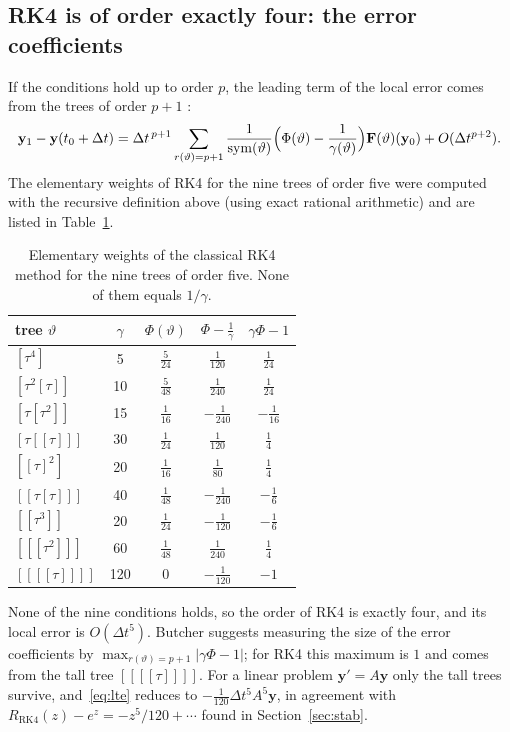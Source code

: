 \documentclass[11pt,a4paper]{article}
\newcommand{\Dt}{\Delta t}
\newcommand{\bfy}{\mathbf{y}}
\begin{document}
\subsection{RK4 is of order exactly four: the error coefficients}\label{sec:rk4err}

If the conditions hold up to order $p$, the leading term of the local error comes from the trees of order
$p+1$ \cite[Sect.~318]{butcher2008}:
\begin{equation}
\bfy_1-\bfy(t_0+\Dt)=\Dt^{\,p+1}\sum_{r(\vartheta)=p+1}\frac{1}{\mathrm{sym}(\vartheta)}
\Bigl(\Phi(\vartheta)-\frac1{\gamma(\vartheta)}\Bigr)\mathbf F(\vartheta)(\bfy_0)+O(\Dt^{p+2}).
\label{eq:lte}
\end{equation}
The elementary weights of RK4 for the nine trees of order five were computed with the recursive definition
above (using exact rational arithmetic) and are listed in Table~\ref{tab:order5}.

\begin{table}[H]
\centering
\begin{tabular}{@{}lcccc@{}}
\toprule
tree $\vartheta$ & $\gamma$ & $\Phi(\vartheta)$ & $\Phi-\tfrac1\gamma$ & $\gamma\Phi-1$\\
\midrule
$[\tau^4]$ & 5 & $\tfrac5{24}$ & $\tfrac1{120}$ & $\tfrac1{24}$\\
$[\tau^2[\tau]]$ & 10 & $\tfrac5{48}$ & $\tfrac1{240}$ & $\tfrac1{24}$\\
$[\tau[\tau^2]]$ & 15 & $\tfrac1{16}$ & $-\tfrac1{240}$ & $-\tfrac1{16}$\\
$[\tau[[\tau]]]$ & 30 & $\tfrac1{24}$ & $\tfrac1{120}$ & $\tfrac14$\\
$[[\tau]^2]$ & 20 & $\tfrac1{16}$ & $\tfrac1{80}$ & $\tfrac14$\\
$[[\tau[\tau]]]$ & 40 & $\tfrac1{48}$ & $-\tfrac1{240}$ & $-\tfrac16$\\
$[[\tau^3]]$ & 20 & $\tfrac1{24}$ & $-\tfrac1{120}$ & $-\tfrac16$\\
$[[[\tau^2]]]$ & 60 & $\tfrac1{48}$ & $\tfrac1{240}$ & $\tfrac14$\\
$[[[[\tau]]]]$ & 120 & $0$ & $-\tfrac1{120}$ & $-1$\\
\bottomrule
\end{tabular}
\caption{Elementary weights of the classical RK4 method for the nine trees of order five. None of them
equals $1/\gamma$.}
\label{tab:order5}
\end{table}

None of the nine conditions holds, so the order of RK4 is exactly four, and its local error is $O(\Dt^5)$.
Butcher suggests measuring the size of the error coefficients by $\max_{r(\vartheta)=p+1}|\gamma\Phi-1|$;
for RK4 this maximum is $1$ and comes from the tall tree $[[[[\tau]]]]$. For a linear problem
$\bfy'=A\bfy$ only the tall trees survive, and~\eqref{eq:lte} reduces to $-\tfrac1{120}\Dt^5A^5\bfy$, in
agreement with $R_{\mathrm{RK4}}(z)-e^z=-z^5/120+\cdots$ found in Section~\ref{sec:stab}.
\end{document}
